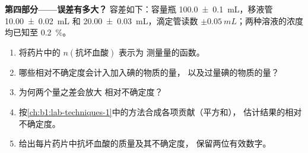 \begin{problem}
\medskip
\noindent\textbf{第四部分——误差有多大？}
容差如下：容量瓶 \qty{100.0 \pm 0.1}{mL}，移液管
\qty{10.00 \pm 0.02}{mL} 和 \qty{20.00 \pm 0.03}{mL}，滴定管读数
$\pm\qty{0.05}{mL}$；两种溶液的浓度均已知至 \qty{0.2}{\percent}。
\begin{enumerate}[resume]
  \item 将药片中的 $n(\text{抗坏血酸})$ 表示为
        测量量的函数。
  \item 哪些相对不确定度会计入加入碘的物质的量，
        以及过量碘的物质的量？
  \item 为何两个量之差会放大
        相对不确定度？
  \item 按\cref{ch:b1:lab-techniques-1}中的方法合成各项贡献（平方和），
        估计结果的相对不确定度。
  \item 给出每片药片中抗坏血酸的质量及其不确定度，
        保留两位有效数字。
\end{enumerate}
\end{problem}
